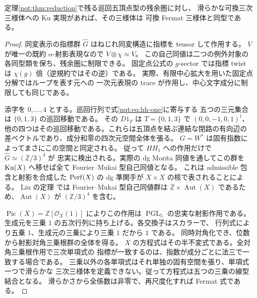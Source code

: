 \begin{proposition}[巡回五頂点型の可換標的候補]
\label{nqt:prop:fermat-target}
定理\ref{nqt:thm:reduction}で残る巡回五頂点型の残余圏に対し、
滑らかな可換三次三様体への Ku 実現があれば、その三様体は
可換 Fermat 三様体と同型である。
\end{proposition}
\begin{proof}
同変表示の指標群 $\widehat G$ はねじれ同変構造に指標を tensor して作用する。
$V$ が唯一の既約 $\alpha$-射影表現なので $V\otimes\chi\simeq V$。
この自己同値は二つの例外対象の各同型類を保ち、残余圏に制限できる。
固定点公式の $g$-sector では指標 twist は $\chi(g)$ 倍（逆規約ではその逆）である。
実際、有限中心拡大を用いた固定点分解ではループを表す元への
一次元表現の trace が作用し、中心文字成分に制限しても同じである。

添字を $0,\ldots,4$ とする。巡回行列で式\eqref{nqt:eq:hh-one}に寄与する
五つの三元集合は $\{0,1,3\}$ の巡回移動である。
その $D1_T$ は $T=\{0,1,3\}$ で $(0,0,-1,0,1)^t$、
他の四つはその巡回移動である。これらは五頂点を結ぶ連結な閉路の有向辺の
差ベクトルであり、成分和零の四次元空間全体を張る。
$G=W^*$ は固有指数によってまさにこの空間と同定される。
従って $HH_1$ への作用だけで $\widehat G\simeq(\mathbb Z/3)^4$ が
忠実に検出される。実際の dg Morita 同値を通してこの群を
$\operatorname{Ku}(X)$ へ移せば全て Fourier--Mukai 型自己同値となる。
これは admissible 包含と射影を合成した $\operatorname{Perf}(X)$ の dg 準関手が
$X\times X$ の核で表されることによる。
Liu の定理 \cite[Theorem~1.1]{NFMLiuCubicThreefoldAut}では Fourier--Mukai 型自己同値群は
$\mathbb Z\times\operatorname{Aut}(X)$ であるため、$\operatorname{Aut}(X)$ が
$(\mathbb Z/3)^4$ を含む。

$\operatorname{Pic}(X)=\mathbb Z[\mathcal O_X(1)]$ によりこの作用は
$\operatorname{PGL}_5$ の忠実な射影作用である。
生成元を三乗 $1$ の五次行列に持ち上げる。各交換子はスカラーで、
行列式により五乗 $1$、生成元の三乗により三乗 $1$ だから $1$ である。
同時対角化でき、位数から射影対角三乗根群の全体を得る。
$X$ の方程式はその半不変式である。全対角三乗根作用で三次単項式の
指標が一致するのは、指数が成分ごとに法三で一致する場合である。
三乗以外の各単項式はそれ単独の固有空間を張り、単項式一つで滑らかな
三次三様体を定義できない。従って方程式は五つの三乗の線型結合となる。
滑らかさから全係数は非零で、再尺度化すれば Fermat 式である。
\end{proof}
